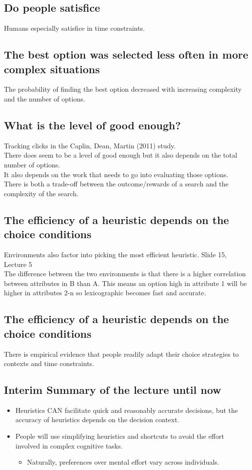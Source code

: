 \subsection{Do people satisfice}
Humans especially satisfice in time constraints.

\subsection{The best option was selected less often in more complex situations}
The probability of finding the best option decreased with increasing complexity and the number of options.

\subsection{What is the level of good enough?}
Tracking clicks in the Caplin, Dean, Martin (2011) study. 
\\There does seem to be a level of good enough but it also depends on the total number of options.
\\It also depends on the work that needs to go into evaluating those options.
\\There is both a trade-off between the outcome/rewards of a search and the complexity of the search.
\subsection{The efficiency of a heuristic depends on the choice conditions}
Environments also factor into picking the most efficient heuristic. Slide 15, Lecture 5
\\The difference between the two environments is that there is a higher correlation between attributes in B than A. This means an option high in attribute 1 will be higher in attributes 2-n so lexicographic becomes fast and accurate.

\subsection{The efficiency of a heuristic depends on the choice conditions}
There is empirical evidence that people readily adapt their choice strategies to contexts and time constraints.
\subsection{Interim Summary
of the lecture until now}
\begin{itemize}
    \item Heuristics CAN facilitate quick and reasonably accurate decisions, but the accuracy of heuristics depends on the decision context.
    \item People will use simplifying heuristics and shortcuts to avoid the effort involved in complex cognitive tasks.
    \begin{itemize}
        \item Naturally, preferences over mental effort vary across individuals.
    \end{itemize}
\end{itemize}
